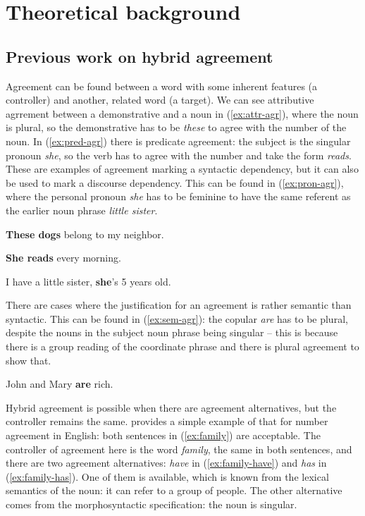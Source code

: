 \chapter{Theoretical background}
\startcontents[chapters]

\section{Previous work on hybrid agreement}
Agreement can be found  between a word with some inherent features (a controller) and another, related word (a target). We can see attributive agrrement between a demonstrative and a noun in (\ref{ex:attr-agr}), where the noun is plural, so the demonstrative has to be \textsl{these} to agree with the number of the noun. In (\ref{ex:pred-agr}) there is predicate agreement: the subject is the singular pronoun \textsl{she}, so the verb has to agree with the number and take the form \textsl{reads}. These are examples of agreement marking a syntactic dependency, but it can also be used to mark a discourse dependency. This can be found in (\ref{ex:pron-agr}), where the personal pronoun \textsl{she} has to be feminine to have the same referent as the earlier noun phrase \textsl{little sister}.

\begin{exe}
  \ex\label{ex:attr-agr}
  \textbf{These dogs} belong to my neighbor.

  \ex\label{ex:pred-agr}
  \textbf{She reads} every morning.

  \ex\label{ex:pron-agr}
  I have a little sister, \textbf{she}'s 5 years old.
\end{exe}

There are cases where the justification for an agreement is rather semantic than syntactic. This can be found in (\ref{ex:sem-agr}): the copular \textsl{are} has to be plural, despite the nouns in the subject noun phrase being singular -- this is because there is a group reading of the coordinate phrase and there is plural agreement to show that. 

\begin{exe}
  \ex\label{ex:sem-agr}
  John and Mary \textbf{are} rich.
\end{exe}

Hybrid agreement is possible when there are agreement alternatives, but the controller remains the same. \cite{corbett_agreement_2023} provides a simple example of that for number agreement in English: both sentences in (\ref{ex:family}) are acceptable. The controller of agreement here is the word \textsl{family}, the same in both sentences, and there are two agreement alternatives: \textsl{have} in (\ref{ex:family-have}) and \textsl{has} in (\ref{ex:family-has}). One of them is available, which is known from the lexical semantics of the noun: it can refer to a group of people. The other alternative comes from the morphosyntactic specification: the noun is singular.

